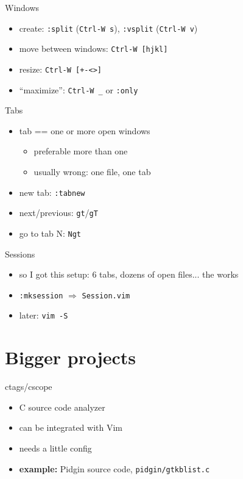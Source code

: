 \documentclass{beamer}
\begin{document}
\begin{frame}{Windows}
  \begin{itemize}
    \item create: \texttt{:split} (\texttt{Ctrl-W s}), \texttt{:vsplit}
    (\texttt{Ctrl-W v})
    \item move between windows: \texttt{Ctrl-W [hjkl]}
    \item resize: \texttt{Ctrl-W [+-<>]}
    \item ``maximize'': \texttt{Ctrl-W \_} or \texttt{:only}
    \pause
  \end{itemize}
\end{frame}

\begin{frame}{Tabs}
  \begin{itemize}
    \item tab == one or more open windows
    \pause
    \begin{itemize}
      \item preferable more than one
      \item usually wrong: one file, one tab
    \end{itemize}
    \pause
    \item new tab: \texttt{:tabnew}
    \item next/previous: \texttt{gt}/\texttt{gT}
    \item go to tab N: \texttt{Ngt}
  \end{itemize}
\end{frame}

\begin{frame}{Sessions}
  \begin{itemize}
    \item so I got this setup: 6 tabs, dozens of open files... the works
    \item \texttt{:mksession} $\Rightarrow$ \texttt{Session.vim}
    \item later: \texttt{vim -S}
  \end{itemize}
\end{frame}

\section{Bigger projects}
\begin{frame}{ctags/cscope}
  \begin{itemize}
    \item C source code analyzer
    \item can be integrated with Vim
    \item needs a little config
    \pause
    \item \textbf{example:} Pidgin source code, \texttt{pidgin/gtkblist.c}
  \end{itemize}
\end{frame}
\end{document}
